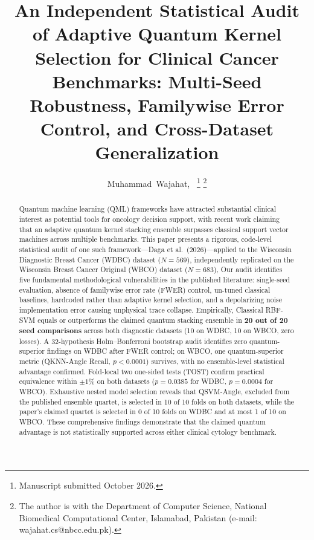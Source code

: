 \documentclass[journal,twocolumn]{IEEEtran}
\begin{document}

\title{An Independent Statistical Audit of Adaptive Quantum Kernel Selection for Clinical Cancer Benchmarks: Multi-Seed Robustness, Familywise Error Control, and Cross-Dataset Generalization}

\author{Muhammad~Wajahat,~%
\thanks{Manuscript submitted October 2026.}%
\thanks{The author is with the Department of Computer Science, National Biomedical Computational Center, Islamabad, Pakistan (e-mail: wajahat.cs@nbcc.edu.pk).}}

\maketitle

\begin{abstract}
Quantum machine learning (QML) frameworks have attracted substantial clinical interest as potential tools for oncology decision support, with recent work claiming that an adaptive quantum kernel stacking ensemble surpasses classical support vector machines across multiple benchmarks. This paper presents a rigorous, code-level statistical audit of one such framework---Daga et al.\ (2026)---applied to the Wisconsin Diagnostic Breast Cancer (WDBC) dataset ($N=569$), independently replicated on the Wisconsin Breast Cancer Original (WBCO) dataset ($N=683$),  Our audit identifies five fundamental methodological vulnerabilities in the published literature: single-seed evaluation, absence of familywise error rate (FWER) control, un-tuned classical baselines, hardcoded rather than adaptive kernel selection, and a depolarizing noise implementation error causing unphysical trace collapse. Empirically, Classical RBF-SVM equals or outperforms the claimed quantum stacking ensemble in \textbf{20 out of 20 seed comparisons} across both diagnostic datasets (10 on WDBC, 10 on WBCO, zero losses). A 32-hypothesis Holm--Bonferroni bootstrap audit identifies zero quantum-superior findings on WDBC after FWER control; on WBCO, one quantum-superior metric (QKNN-Angle Recall, $p < 0.0001$) survives, with no ensemble-level statistical advantage confirmed. Fold-local two one-sided tests (TOST) confirm practical equivalence within $\pm 1\%$ on both datasets ($p = 0.0385$ for WDBC, $p = 0.0004$ for WBCO). Exhaustive nested model selection reveals that QSVM-Angle, excluded from the published ensemble quartet, is selected in 10 of 10 folds on both datasets, while the paper's claimed quartet is selected in 0 of 10 folds on WDBC and at most 1 of 10 on WBCO. These comprehensive findings demonstrate that the claimed quantum advantage is not statistically supported across either clinical cytology benchmark.
\end{abstract}
\end{document}
